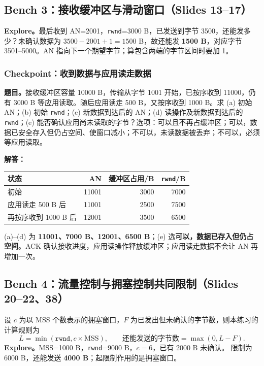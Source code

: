 \documentclass[11pt,a4paper,fontset=fandol]{ctexart}
\renewcommand{\exercisequestion}[2]{%
  \Needspace{5\baselineskip}%
  \subsubsection{#2}\label{exercise:#1}%
}
\renewenvironment{checkedsolution}
  {\par\nopagebreak[4]\textbf{解答：}\ignorespaces}
  {\par}
\begin{document}
\subsection{Bench 3：接收缓冲区与滑动窗口（Slides 13--17）}

\textbf{Explore。}最后收到 AN=2001，\texttt{rwnd}=3000 B，已发送到字节 3500，还能发多少？未确认数据为 $3500-2001+1=1500$ B，故还能发 \textbf{1500 B}，对应字节 3501--5000。AN 指向下一个期望字节；算包含两端的字节区间时要加 1。

\exercisequestion{SC2008-HW05-Q03}{Checkpoint：收到数据与应用读走数据}
\textbf{题目。}接收缓冲区容量 10000 B，传输从字节 1001 开始，已按序收到 11000，仍有 3000 B 等应用读取。随后应用读走 500 B，又按序收到 1000 B。求 (a) 初始 AN；(b) 初始 \texttt{rwnd}；(c) 新数据到达后的 AN；(d) 读操作及新数据到达后的 \texttt{rwnd}；(e) 能否确认应用尚未读取的字节？选项：可以且不再占缓冲区；可以，数据已安全存入但仍占空间、使窗口减小；不可以，未读数据被丢弃；不可以，必须等应用读取。
\begin{checkedsolution}
\begin{center}
\small
\begin{tabular}{@{}lrrr@{}}
\toprule
状态 & AN & 缓冲区占用/B & \texttt{rwnd}/B \\
\midrule
初始 & 11001 & 3000 & 7000 \\
应用读走 500 B 后 & 11001 & 2500 & 7500 \\
再按序收到 1000 B 后 & 12001 & 3500 & 6500 \\
\bottomrule
\end{tabular}
\end{center}
(a)--(d) 为 \textbf{11001、7000 B、12001、6500 B}；(e) 选\textbf{可以，数据已存入但仍占空间}。ACK 确认接收进度，应用读操作释放缓冲区；应用读走数据不会让 AN 再增加一次。
\end{checkedsolution}

\subsection{Bench 4：流量控制与拥塞控制共同限制（Slides 20--22、38）}

设 $c$ 为以 MSS 个数表示的拥塞窗口，$F$ 为已发出但未确认的字节数，则本练习的计算规则为
\[
 L=\min(\texttt{rwnd},c\times\mathrm{MSS}),\qquad
 \text{还能发送的字节数}=\max(0,L-F).
\]
\textbf{Explore。}MSS=1000 B，\texttt{rwnd}=9000 B，$c=6$，已有 2000 B 未确认。
限制为 6000 B，还能发送 \textbf{4000 B}；起限制作用的是拥塞窗口。
\end{document}
